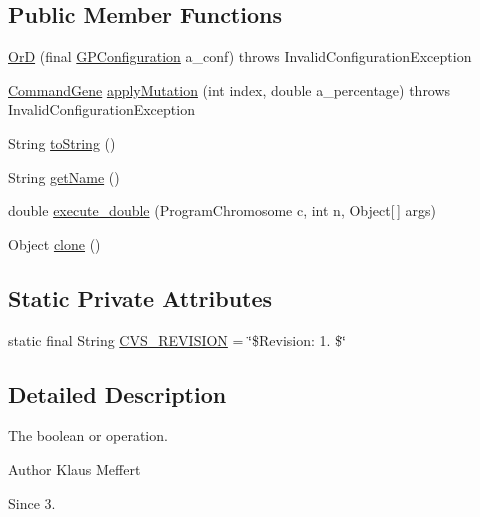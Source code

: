 \subsection*{Public Member Functions}
\begin{DoxyCompactItemize}
\item 
\hyperlink{classexamples_1_1gp_1_1symbolic_regression_1_1_or_d_a6e36392dcb3af179e71c2fee5bbf75e7}{Or\-D} (final \hyperlink{classorg_1_1jgap_1_1gp_1_1impl_1_1_g_p_configuration}{G\-P\-Configuration} a\-\_\-conf)  throws Invalid\-Configuration\-Exception 
\item 
\hyperlink{classorg_1_1jgap_1_1gp_1_1_command_gene}{Command\-Gene} \hyperlink{classexamples_1_1gp_1_1symbolic_regression_1_1_or_d_ab7082c758bcb12270bac71912a083591}{apply\-Mutation} (int index, double a\-\_\-percentage)  throws Invalid\-Configuration\-Exception 
\item 
String \hyperlink{classexamples_1_1gp_1_1symbolic_regression_1_1_or_d_a5f6d7373cddd3429ca008fe069f9a2a4}{to\-String} ()
\item 
String \hyperlink{classexamples_1_1gp_1_1symbolic_regression_1_1_or_d_a76c6cd9e28fa60a592d93f79c29a17cb}{get\-Name} ()
\item 
double \hyperlink{classexamples_1_1gp_1_1symbolic_regression_1_1_or_d_a785315e4cb88eb3c69c468ef295b4a92}{execute\-\_\-double} (Program\-Chromosome c, int n, Object\mbox{[}$\,$\mbox{]} args)
\item 
Object \hyperlink{classexamples_1_1gp_1_1symbolic_regression_1_1_or_d_a0837e7de6f436bea98899f14d6dc9bc9}{clone} ()
\end{DoxyCompactItemize}
\subsection*{Static Private Attributes}
\begin{DoxyCompactItemize}
\item 
static final String \hyperlink{classexamples_1_1gp_1_1symbolic_regression_1_1_or_d_ace81b688ea250b0a8593ef9f469b985e}{C\-V\-S\-\_\-\-R\-E\-V\-I\-S\-I\-O\-N} = \char`\"{}\$Revision\-: 1. \$\char`\"{}
\end{DoxyCompactItemize}


\subsection{Detailed Description}
The boolean or operation.

\begin{DoxyAuthor}{Author}
Klaus Meffert 
\end{DoxyAuthor}
\begin{DoxySince}{Since}
3. 
\end{DoxySince}


